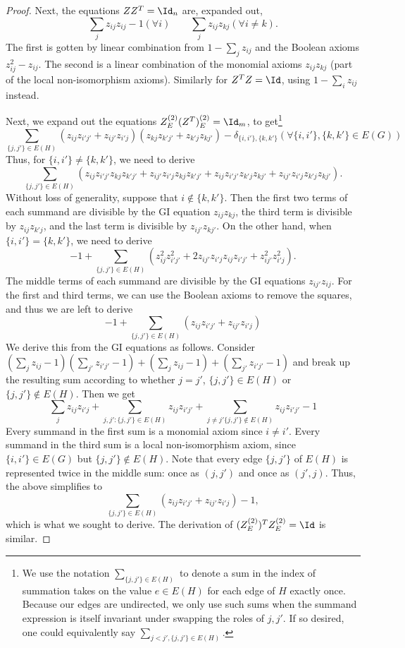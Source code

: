\begin{proof}
Next, the equations $ZZ^T=\Id_n$ are, expanded out, 
\[
\sum_j z_{ij} z_{ij} -1 (\forall i) \qquad \sum_j z_{ij} z_{kj} (\forall i \neq k).
\]
The first is gotten by linear combination from $1-\sum_j z_{ij}$ and the Boolean axioms $z_{ij}^2 - z_{ij}$. The second is a linear combination of the monomial axioms $z_{ij} z_{kj}$ (part of the local non-isomorphism axioms). Similarly for $Z^T Z = \Id$, using $1 - \sum_i z_{ij}$ instead.

Next, we expand out the equations $Z^{(2)}_E (Z^T)^{(2)}_E = \Id_m$, to get\footnote{We use the notation $\sum_{\{j,j'\} \in E(H)}$ to denote a sum in the index of summation takes on the value $e \in E(H)$ for each edge of $H$ exactly once. Because our edges are undirected, we only use such sums when the summand expression is itself invariant under swapping the roles of $j,j'$. If so desired, one could equivalently say $\sum_{j < j', \{j,j'\} \in E(H)}$.}
\[
\sum_{\{j,j'\} \in E(H)} (z_{ij} z_{i'j'} + z_{ij'} z_{i'j})(z_{kj} z_{k'j'} + z_{k'j} z_{kj'}) - \delta_{\{i,i'\}, \{k,k'\}} (\forall \{i,i'\}, \{k,k'\} \in E(G))
\]
Thus, for $\{i,i'\} \neq \{k,k'\}$, we need to derive
\[
\sum_{\{j,j'\} \in E(H)} \left( z_{ij} z_{i'j'} z_{kj} z_{k'j'}+ z_{ij'} z_{i'j} z_{kj} z_{k'j'} + z_{ij} z_{i'j'} z_{k'j} z_{kj'} + z_{ij'} z_{i'j} z_{k'j} z_{kj'} \right).
\]
Without loss of generality, suppose that $i \notin \{k,k'\}$. Then the first two terms of each summand are divisible by the \textsc{GI} equation $z_{ij} z_{kj}$, the third term is divisible by $z_{ij} z_{k'j}$, and the last term is divisible by $z_{ij'} z_{kj'}$. 
On the other hand, when $\{i,i'\} = \{k,k'\}$, we need to derive
\[
-1 + \sum_{\{j,j'\} \in E(H)} \left( z_{ij}^2 z_{i'j'}^2 + 2 z_{ij'} z_{i'j} z_{ij} z_{i'j'} + z_{ij'}^2 z_{i'j}^2 \right).
\]
The middle terms of each summand are divisible by the \textsc{GI} equations $z_{ij'} z_{ij}$. For the first and third terms, we can use the Boolean axioms to remove the squares, and thus we are left to derive
\begin{equation} \label{eq:Z2}
-1 + \sum_{\{j,j'\} \in E(H)} \left(z_{ij} z_{i'j'} + z_{ij'} z_{i'j} \right)
\end{equation}
We derive this from the \textsc{GI} equations as follows. Consider $(\sum_{j} z_{ij} -1)(\sum_{j'} z_{i'j'} -1) + (\sum_{j} z_{ij} -1) + (\sum_{j'} z_{i'j'} -1)$ and break up the resulting sum according to whether $j = j'$, $\{j,j'\} \in E(H)$ or $\{j,j'\} \notin E(H)$. Then we get
\[
\sum_j z_{ij} z_{i'j}  + \sum_{j,j' : \{j,j'\} \in E(H)} z_{ij} z_{i'j'} + \sum_{j \neq j' \{j,j'\} \notin E(H)} z_{ij} z_{i'j'} - 1
\]
Every summand in the first sum is a monomial axiom since $i \neq i'$. Every summand in the third sum is a local non-isomorphism axiom, since $\{i,i'\} \in E(G)$ but $\{j,j'\} \notin E(H)$. Note that every edge $\{j,j'\}$ of $E(H)$ is represented twice in the middle sum: once as $(j,j')$ and once as $(j',j)$. Thus, the above simplifies to 
\[
\sum_{\{j,j'\} \in E(H)} (z_{ij} z_{i'j'} + z_{ij'} z_{i'j}) -1,
\]
which is what we sought to derive. The derivation of $(Z^{(2)}_E)^T Z^{(2)}_E = \Id$ is similar.


\end{proof}
